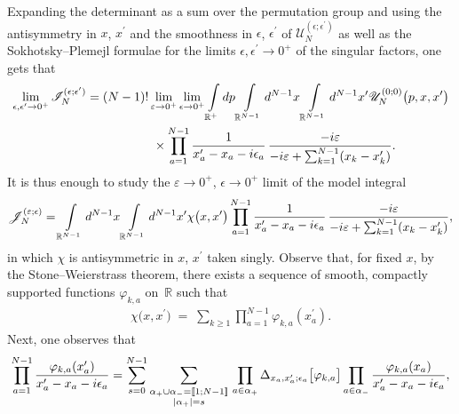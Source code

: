 \documentclass[11pt]{article}
\numberwithin{equation}{section}
\numberwithin{equation}{section}
\begin{document}
Expanding the determinant as a sum over the permutation group and using the antisymmetry in $x$, $x^{\prime}$ and the smoothness in
$\epsilon$, $\epsilon^{\prime}$ of $\mathscr{U}_N^{(\epsilon;\epsilon^{\prime})}$ as well as the Sokhotsky--Plemejl formulae for the limits
$\epsilon, \epsilon^{\prime} \rightarrow 0^+$ of the singular factors, one gets that
\begin{gather*}
\lim_{ \epsilon,\epsilon^{\prime}\rightarrow 0^+ } \mathscr{I}_N^{(\epsilon;\epsilon^{\prime})} =
 (N-1)! \lim_{\varepsilon\rightarrow 0^+} \lim_{ \epsilon \rightarrow 0^+ }
\int\limits_{\mathbb{R}^+}{} {\rm d}p \int\limits_{\mathbb{R}^{N-1}}{} {\rm d}^{N-1}x
\int\limits_{\mathbb{R}^{N-1}}{} {\rm d}^{N-1}x^{\prime} \mathscr{U}_N^{(0;0)}\big(p,x,x^{\prime} \big)
\\ \hphantom{\lim_{ \epsilon,\epsilon^{\prime}\rightarrow 0^+ } \mathscr{I}_N^{(\epsilon;\epsilon^{\prime})} =}
\times \prod\limits_{a=1}^{N-1} \frac{ 1 }{ x^{\prime}_a - x_a -{\rm i} \epsilon_a } \,\frac{-{\rm i} \varepsilon }{
 -{\rm i} \varepsilon + \sum_{k=1}^{N-1}(x_k - x_k^{\prime}) }.
\end{gather*}
It is thus enough to study the $\varepsilon\rightarrow 0^+$, $\epsilon \rightarrow 0^+ $ limit of the model integral
\begin{gather*}
\mathscr{J}_N^{(\varepsilon;\epsilon)} = \int\limits_{\mathbb{R}^{N-1}}{} {\rm d}^{N-1}x
\int\limits_{\mathbb{R}^{N-1}}{} {\rm d}^{N-1}x^{\prime} \chi\big(x,x^{\prime} \big)
 \prod\limits_{a=1}^{N-1} \frac{1}{x^{\prime}_a-x_a-{\rm i} \epsilon_a }
\, \frac{-{\rm i} \varepsilon }{-{\rm i} \varepsilon + \sum_{k=1}^{N-1}(x_k - x_k^{\prime}) },
\end{gather*}
in which $\chi$ is antisymmetric in $x$, $x^{\prime}$ taken singly. Observe that, for fixed $x$, by the Stone--Weierstrass theorem, there
exists a sequence of smooth, compactly supported functions $\varphi_{k,a}$ on~$\mathbb{R}$ such that
\begin{gather*}
 \chi\big(x,x^{\prime} \big) \; = \; \sum_{k\geq 1 }{} \prod\limits_{a=1}^{N-1}\varphi_{k,a}(x_a^{\prime}).
\end{gather*}
Next, one observes that
\begin{gather*}
\prod\limits_{a=1}^{N-1} \frac{ \varphi_{k,a}(x_a^{\prime}) }{x^{\prime}_a-x_a-{\rm i} \epsilon_a }
 = \sum_{s=0}^{N-1} \sum\limits_{ \substack{ \alpha_+\cup \alpha_- = [\![1;N-1]\!] \\ |\alpha_+|=s } }{}
\prod\limits_{a \in \alpha_+}{} \Delta_{x_a,x_a^{\prime}; \epsilon_a}\big[ \varphi_{k,a}\big] \prod\limits_{a \in \alpha_-}{}
\frac{ \varphi_{k,a}(x_a ) }{x^{\prime}_a-x_a-{\rm i} \epsilon_a },
\end{gather*}
\end{document}
